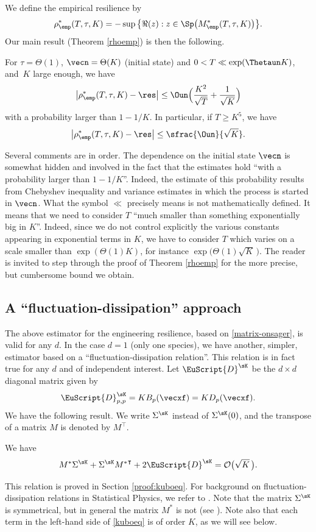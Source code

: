 We define the empirical resilience by
\[
\rho^*_\emp(T,\tau,K)=
- \sup\big\{ \Re (z): z\in\Sp\bigl(M^{*}_\emp(T,\tau,K)\bigr)\big\}.
\]
Our main result (Theorem \ref{rhoemp}) is then the following.
\begin{theorem*}
For $\tau=\Theta(1)$, $\vecn=\Theta(K)$ (initial state) and $0<T\ll \exp(\Thetaun K)$,
and~$K$ large enough, we have
\[
\big|\rho^*_\emp(T,\tau,K)-\res\big|\le
\Oun \Bigl(\frac{K^2}{\sqrt{T}} +\frac{1}{\sqrt{K}}\Bigr)
\]
with a probability larger than $1-1/K$. In particular, if $T\geq K^5$, we have
\[
\big|\rho^*_\emp(T,\tau,K)-\res\big|\leq \sfrac{\Oun}{\sqrt{K}}.
\]
\end{theorem*}
Several comments are in order.
The dependence on the initial state $\vecn$ is somewhat hidden and involved in the fact that the estimates hold ``with a probability larger than $1-1/K$''.
Indeed, the estimate of this probability results from Chebyshev inequality and variance estimates in which the process is started in
$\vecn$.
What the symbol $\ll$ precisely means is not mathematically defined. It means that we need to consider $T$ ``much smaller than
something exponentially big in $K$''. Indeed, since we do not control explicitly the various constants appearing in exponential terms in $K$, we have to
consider $T$ which varies on a scale smaller than $\exp(\Theta(1)K)$, for instance $\exp\bigl(\Theta(1)\sqrt{K}\,\bigr)$. The
reader is invited to step through the proof of Theorem \ref{rhoemp} for the more precise, but cumbersome bound we obtain.

\subsection{A ``fluctuation-dissipation'' approach}

The above estimator for the engineering resilience, based on \eqref{matrix-onsager}, is valid for any $d$.
In the case $d=1$ (only one species), we have another, simpler, estimator based on a ``fluctuation-dissipation relation''.
This relation is in fact true for any $d$ and of independent interest.
Let $\EuScript{D}^{\sK}$ be the $d\times d$ diagonal matrix given by
\[
\EuScript{D}^{\sK}_{p,p}=K B_{p}(\vecxf)=K D_{p}(\vecxf).
\]
We have the following result. We write $\Sigma^{\sK}$ instead of $\Sigma^{\sK}(0)$, and the transpose of a matrix $M$ is denoted
by $M^{\intercal}$.
\begin{theorem}\label{thm-Kubo}
We have
\begin{equation}\label{kuboeq}
M^*\Sigma^{\sK}+\Sigma^{\sK}{M^*}^{\intercal}+2\EuScript{D}^{\sK}=\mathcal{O}\bigl(\sqrt{K}\,\bigr).
\end{equation}
\end{theorem}
This relation is proved in Section \ref{proof:kuboeq}. For background on fluctuation-dissipation relations in Statistical
Physics, we refer to \cite[\S\S 2-3]{kubo}. Note that the matrix $\Sigma^{\sK}$ is symmetrical, but in general the matrix
$M^*$ is not (see
\cite{ccm2}). Note also that each term in the left-hand side of \eqref{kuboeq} is of order $K$, as we will see below.

